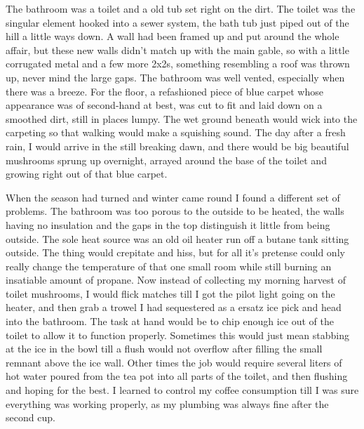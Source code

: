 \documentclass[ebook, 10pt, openright, onecolumn]{memoir}
\begin{document}
The bathroom was a toilet and a old tub set right on the dirt.  The toilet was
the singular element hooked into a sewer system, the bath tub just piped out of
the hill a little ways down.  A wall had been framed up and put around the whole
affair, but these new walls didn't match up with the main gable, so with a
little corrugated metal and a few more 2x2s, something resembling a roof was
thrown up, never mind the large gaps.  The bathroom was well vented, especially
when there was a breeze.  For the floor, a refashioned piece of blue carpet
whose appearance was of second-hand at best, was cut to fit and laid down on a
smoothed dirt, still in places lumpy.  The wet ground beneath would wick into
the carpeting so that walking would make a squishing sound.  The day after a
fresh rain, I would arrive in the still breaking dawn, and there would be big
beautiful mushrooms sprung up overnight, arrayed around the base of the toilet
and growing right out of that blue carpet.

When the season had turned and winter came round I found a different set of
problems.  The bathroom was too porous to the outside to be heated, the walls
having no insulation and the gaps in the top distinguish it little from being
outside. The sole heat source was an old oil heater run off a butane tank
sitting outside. The thing would crepitate and hiss, but for all it's pretense
could only really change the temperature of that one small room while still
burning an insatiable amount of propane.  Now instead of collecting my morning
harvest of toilet mushrooms, I would flick matches till I got the pilot light
going on the heater, and then grab a trowel I had sequestered as a ersatz ice
pick and head into the bathroom.  The task at hand would be to chip enough ice
out of the toilet to allow it to function properly.  Sometimes this would just
mean stabbing at the ice in the bowl till a flush would not overflow after
filling the small remnant above the ice wall. Other times the job would require
several liters of hot water poured from the tea pot into all parts of the
toilet, and then flushing and hoping for the best.  I learned to control my
coffee consumption till I was sure everything was working properly, as my
plumbing was always fine after the second cup. 
\end{document}
